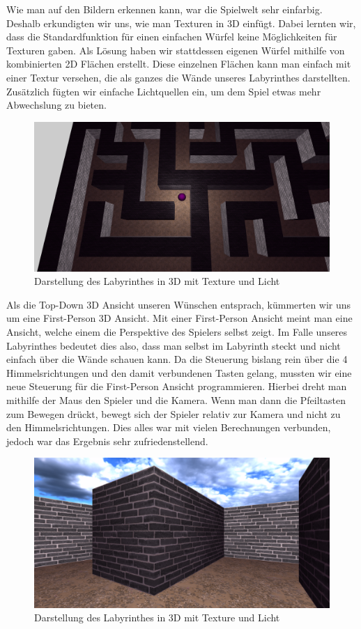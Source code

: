 Wie man auf den Bildern erkennen kann, war die Spielwelt sehr einfarbig. Deshalb erkundigten wir uns, wie man Texturen in 3D einfügt. Dabei lernten wir, dass die Standardfunktion für einen einfachen Würfel keine Möglichkeiten für Texturen gaben. Als Lösung haben wir stattdessen eigenen Würfel mithilfe von kombinierten 2D Flächen erstellt. Diese einzelnen Flächen kann man einfach mit einer Textur versehen, die als ganzes die Wände unseres Labyrinthes darstellten. Zusätzlich fügten wir einfache Lichtquellen ein, um dem Spiel etwas mehr Abwechslung zu bieten. 
\begin{figure}[h]
    \centering
    \includegraphics[width=\paperwidth-3in]{../assets/img/Fr3DTopDownTexture.PNG}
    \caption{Darstellung des Labyrinthes in 3D mit Texture und Licht}
    \label{fig:TopDown}
\end{figure}

Als die Top-Down 3D Ansicht unseren Wünschen entsprach, kümmerten wir uns um eine First-Person 3D Ansicht. Mit einer First-Person Ansicht meint man eine Ansicht, welche einem die Perspektive des Spielers selbst zeigt. Im Falle unseres Labyrinthes bedeutet dies also, dass man selbst im Labyrinth steckt und nicht einfach über die Wände schauen kann.
Da die Steuerung bislang rein über die 4 Himmelsrichtungen und den damit verbundenen Tasten gelang, mussten wir eine neue Steuerung für die First-Person Ansicht programmieren. Hierbei dreht man mithilfe der Maus den Spieler und die Kamera. Wenn man dann die Pfeiltasten zum Bewegen drückt, bewegt sich der Spieler relativ zur Kamera und nicht zu den Himmelsrichtungen. Dies alles war mit vielen Berechnungen verbunden, jedoch war das Ergebnis sehr zufriedenstellend.
\begin{figure}[h]
    \centering
    \includegraphics[width=\paperwidth-3in]{../assets/img/Fr3DFirstPersonTexture.PNG}
    \caption{Darstellung des Labyrinthes in 3D mit Texture und Licht}
    \label{fig:TopDown}
\end{figure}

